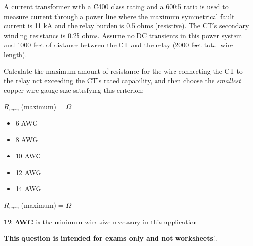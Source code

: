 

A current transformer with a C400 class rating and a 600:5 ratio is used to measure current through a power line where the maximum symmetrical fault current is 11 kA and the relay burden is 0.5 ohms (resistive).  The CT's secondary winding resistance is 0.25 ohms.  Assume no DC transients in this power system and 1000 feet of distance between the CT and the relay (2000 feet total wire length).

\vskip 10pt

Calculate the maximum amount of resistance for the wire connecting the CT to the relay not exceeding the CT's rated capability, and then choose the {\it smallest} copper wire gauge size satisfying this criterion:

\vskip 10pt

$R_{wire}$ (maximum) = \underbar{\hskip 50pt} $\Omega$

\vskip 10pt

\begin{itemize}
\item{} 6 AWG
\item{} 8 AWG
\item{} 10 AWG
\item{} 12 AWG
\item{} 14 AWG
\end{itemize}







$R_{wire}$ (maximum) =  $\Omega$

\vskip 10pt

{\bf 12 AWG} is the minimum wire size necessary in this application.







{\bf This question is intended for exams only and not worksheets!}.



